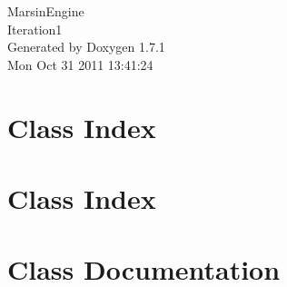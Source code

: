 \documentclass[a4paper]{book}
\begin{document}
\begin{titlepage}
\vspace*{7cm}
\begin{center}
{\Large MarsinEngine \\[1ex]\large Iteration1 }\\
\vspace*{1cm}
{\large Generated by Doxygen 1.7.1}\\
\vspace*{0.5cm}
{\small Mon Oct 31 2011 13:41:24}\\
\end{center}
\end{titlepage}
\clearemptydoublepage
{}
\tableofcontents
\clearemptydoublepage
{}
\chapter{Class Index}

\chapter{Class Index}

\chapter{Class Documentation}


















\printindex
\end{document}

